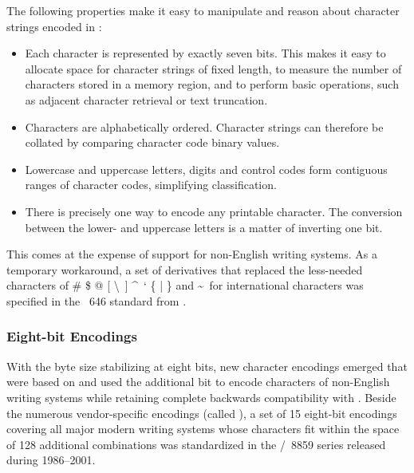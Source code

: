 \documentclass[
  a5paper,10pt,           %
  dvipsnames              %
]{book}
\begin{document}
The following properties make it easy to manipulate and reason about character
strings encoded in :
\begin{itemize}
  \item Each character is represented by exactly seven bits. This makes it easy
    to allocate space for character strings of fixed length, to measure the
    number of characters stored in a memory region, and to perform basic
    operations, such as adjacent character retrieval or text truncation.
  \item Characters are alphabetically ordered. Character strings can therefore
    be collated by comparing character code binary values.
  \item Lowercase and uppercase letters, digits and control codes form
    contiguous ranges of character codes, simplifying classification.
  \item There is precisely one way to encode any printable character. The
    conversion between the lower- and uppercase letters is a matter of
    inverting one bit.
\end{itemize}
This comes at the expense of support for non-English writing systems. As a
temporary workaround, a set of  derivatives that replaced the
less-needed characters of \# \$ @ [ \textbackslash\ ] \textasciicircum\ ` \{ |
\} and \textasciitilde\ for international characters was specified in the
~646 standard \cite{iso72} from \citeyear{iso72}.

\subsubsection{Eight-bit Encodings}
With the byte size stabilizing at eight bits, new character encodings emerged
that were based on  and used the additional bit to encode
characters of non-English writing systems while retaining complete backwards
compatibility with . Beside the numerous vendor-specific
encodings (called ), a set of 15 eight-bit encodings covering
all major modern writing systems whose characters fit within the space of 128
additional combinations was standardized in the
/~8859 series released during 1986--2001.

\end{document}
